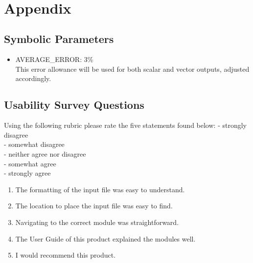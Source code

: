 \documentclass[12pt, titlepage]{article}
\begin{document}
~\newpage


\section{Appendix}


\subsection{Symbolic Parameters}
\label{symbolpara}
\begin{itemize}

\item[\label{Cons_AVERAGE_ERROR}]AVERAGE\_ERROR: 3\%\\This error allowance will
  be used for both scalar and vector outputs, adjusted accordingly.

\end{itemize}


\subsection{Usability Survey Questions} \label{usabilitysurevyquestions}

Using the following rubric please rate the five statements found below:
\linebreak
{} - strongly disagree\\
 - somewhat disagree\\
 - neither agree nor disagree\\
 - somewhat agree\\
 - strongly agree\\

\begin{enumerate}
\item The formatting of the input file was easy to understand.
\item The location to place the input file was easy to find.
\item Navigating to the correct module was straightforward.
\item The User Guide of this product explained the modules well.
\item I would recommend this product.
\end{enumerate}
\end{document}
